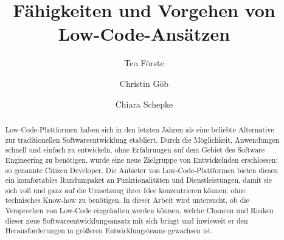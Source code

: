 \documentclass[acmtog, language=ngerman]{acmart}
\begin{document}

\title{Fähigkeiten und Vorgehen von Low-Code-Ansätzen}

\author{Teo Förste}
\author{Christin Göb}
\authornotemark[1]
\author{Chiara Schepke}
\authornotemark[1]
\renewcommand{\shortauthors}{Förste, Göb, Schepke}

\begin{abstract}
  Low-Code-Plattformen haben sich in den letzten Jahren als eine beliebte Alternative zur traditionellen Softwareentwicklung etabliert. \cite{studie_low_code} Durch die Möglichkeit, Anwendungen schnell und einfach zu entwickeln, ohne Erfahrungen auf dem Gebiet des Software Engineering zu benötigen, wurde eine neue Zielgruppe von Entwickelnden erschlossen: so genannte Citizen Developer. Die Anbieter von Low-Code-Plattformen bieten diesen ein komfortables Rundumpaket an Funktionalitäten und Dienstleistungen, damit sie sich voll und ganz auf die Umsetzung ihrer Idee konzentrieren können, ohne technisches Know-how zu benötigen. In dieser Arbeit wird untersucht, ob die Versprechen von Low-Code eingehalten werden können, welche Chancen und Risiken dieser neue Softwareentwicklungsansatz mit sich bringt und inwieweit er den Herausforderungen in größeren Entwicklungsteams gewachsen ist.
\end{abstract}
\end{document}
